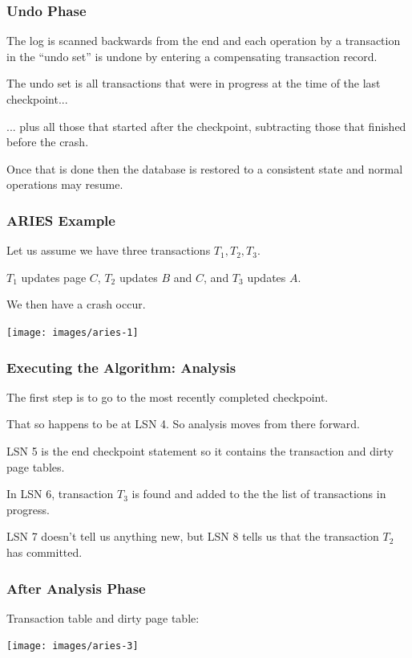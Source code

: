 \begin{frame}
\frametitle{Undo Phase}

The log is scanned backwards from the end and each operation by a transaction in the ``undo set'' is undone by entering a compensating transaction record. 

The undo set is all transactions that were in progress at the time of the last checkpoint...

... plus all those that started after the checkpoint, subtracting those that finished before the crash.

Once that is done then the database is restored to a consistent state and normal operations may resume. 

\end{frame}


\begin{frame}
\frametitle{ARIES Example}

Let us assume we have three transactions $T_{1}, T_{2}, T_{3}$.

$T_{1}$ updates page $C$, $T_{2}$ updates $B$ and $C$, and $T_{3}$ updates $A$. 

We then have a crash occur.

\begin{center}
\texttt{[image: images/aries-1]}
\end{center}

\end{frame}

\begin{frame}
\frametitle{Executing the Algorithm: Analysis}

The first step is to go to the most recently completed checkpoint. 

That so happens to be at LSN 4. So analysis moves from there forward. 

LSN 5 is the end checkpoint statement so it contains the transaction and dirty page tables. 

In LSN 6, transaction $T_{3}$ is found and added to the the list of transactions in progress. 

LSN 7 doesn't tell us anything new, but LSN 8 tells us that the transaction $T_{2}$ has committed. 

\end{frame}



\begin{frame}
\frametitle{After Analysis Phase}

Transaction table and dirty page table:

\begin{center}
\texttt{[image: images/aries-3]}
\end{center}


\end{frame}



